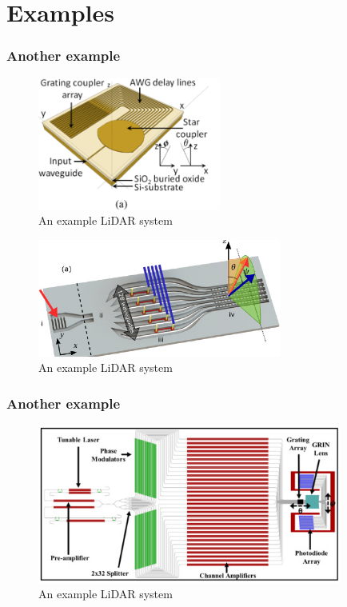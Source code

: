 \documentclass{beamer}
\begin{document}
\section{Examples} 
\begin{frame}
\frametitle{Another example}
    \begin{figure}[htbp]
    \begin{center}
    \includegraphics[width=6cm]{graphs/pic6_6}
    \caption{An example LiDAR system \cite{pic6_opa}}
    \label{default}
    \end{center}
    \end{figure}
\end{frame}
\begin{frame}
    \begin{figure}[htbp]
    \begin{center}
    \includegraphics[width=8cm]{graphs/pic2}
    \caption{An example LiDAR system \cite{pic2}}
    \label{default}
    \end{center}
    \end{figure}
\end{frame}
\begin{frame}
\frametitle{Another example}
    \begin{figure}[htbp]
    \begin{center}
    \includegraphics[width=10cm]{graphs/pic4}
    \caption{An example LiDAR system \cite{pic4}}
    \label{default}
    \end{center}
    \end{figure}
\end{frame}
\end{document}
